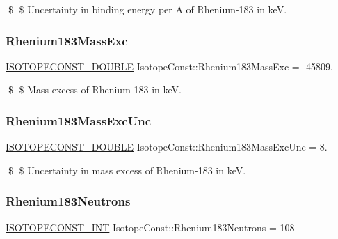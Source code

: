 \$ \$ Uncertainty in binding energy per A of Rhenium-\/183 in keV. \mbox{\label{group___isotope_const-_rhenium-_re183_gad8ca43a779e54266f9648374b8080e15}} 
\subsubsection{\texorpdfstring{Rhenium183\+Mass\+Exc}{Rhenium183MassExc}}
{\footnotesize\ttfamily \mbox{\hyperlink{group___isotope_const-_macros_ga8f45a7272ce02c0b4c65c44636ed719a}{I\+S\+O\+T\+O\+P\+E\+C\+O\+N\+S\+T\+\_\+\+D\+O\+U\+B\+LE}} Isotope\+Const\+::\+Rhenium183\+Mass\+Exc = -\/45809.}

\$ \$ Mass excess of Rhenium-\/183 in keV. \mbox{\label{group___isotope_const-_rhenium-_re183_ga0e26b57cf03723e758ed226cb0560acd}} 
\subsubsection{\texorpdfstring{Rhenium183\+Mass\+Exc\+Unc}{Rhenium183MassExcUnc}}
{\footnotesize\ttfamily \mbox{\hyperlink{group___isotope_const-_macros_ga8f45a7272ce02c0b4c65c44636ed719a}{I\+S\+O\+T\+O\+P\+E\+C\+O\+N\+S\+T\+\_\+\+D\+O\+U\+B\+LE}} Isotope\+Const\+::\+Rhenium183\+Mass\+Exc\+Unc = 8.}

\$ \$ Uncertainty in mass excess of Rhenium-\/183 in keV. \mbox{\label{group___isotope_const-_rhenium-_re183_ga8090fa9c121833c3e925d515f47683e8}} 
\subsubsection{\texorpdfstring{Rhenium183\+Neutrons}{Rhenium183Neutrons}}
{\footnotesize\ttfamily \mbox{\hyperlink{group___isotope_const-_macros_ga5f18360b3e99483a35c32d789e62621c}{I\+S\+O\+T\+O\+P\+E\+C\+O\+N\+S\+T\+\_\+\+I\+NT}} Isotope\+Const\+::\+Rhenium183\+Neutrons = 108}

